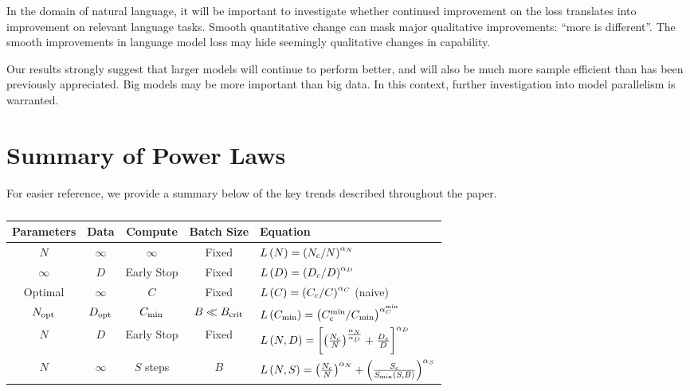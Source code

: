 \documentclass[english]{article}
\begin{document}
In the domain of natural language, it will be important to investigate whether continued improvement on the loss translates into improvement on relevant language tasks.  Smooth quantitative change can mask major qualitative improvements: ``more is different''.  The smooth improvements in language model loss may hide seemingly qualitative changes in capability.

Our results strongly suggest that larger models will continue to perform better, and will also be much more sample efficient than has been previously appreciated.  Big models may be more important than big data.  In this context, further investigation into model parallelism is warranted.

\newpage
\appendix
\appendixpage
\addappheadtotoc 


\section{Summary of Power Laws}

For easier reference, we provide a summary below of the key trends described throughout the paper.

\begin{table}[h!]
\centering
\vspace{-0.5em}
\begin{tabular}{|c|c|c|c|l|}
\hline 
\textbf{Parameters}  & \textbf{Data}  & \textbf{Compute}  & \textbf{Batch Size}  & \textbf{Equation}\tabularnewline
\hline 
\hline 
$N$  & $\infty$  & \multicolumn{1}{c|}{$\infty$ } & Fixed  & $L\left(N\right)=\left(N_{{\rm c}}/N\right)^{\alpha_{N}}$\tabularnewline
\hline 
$\infty$  & $D$  & \multicolumn{1}{c|}{Early Stop } & Fixed  & $L\left(D\right)=\left(D_{{\rm c}}/D\right)^{\alpha_{D}}$\tabularnewline
\hline 
Optimal  & $\infty$  & $C$  & Fixed  & $L\left(C\right)=\left(C_{{\rm c}}/C\right)^{\alpha_{C}}$ (naive)\tabularnewline
\hline 
$N_{{\rm opt}}$ & $D_{{\rm opt}}$ & $C_{{\rm min}}$  & $B\ll B_{{\rm crit}}$  & $L\left(C_{{\rm min}}\right)=\left(C_{{\rm c}}^{{\rm min}}/C_{{\rm min}}\right)^{\alpha_{C}^{{\rm min}}}$\tabularnewline
\hline 
$N$  & $D$  & \multicolumn{1}{c|}{Early Stop } & Fixed  & $L\left(N,D\right)=\left[\left(\frac{N_{{\rm c}}}{N}\right)^{\frac{\alpha_{N}}{\alpha_{D}}}+\frac{D_{c}}{D}\right]^{\alpha_{D}}$\tabularnewline
\hline 
$N$  & $\infty$  & $S$ steps & $B$  & $L\left(N,S\right)=\left(\frac{N_{{\rm c}}}{N}\right)^{\alpha_{N}}+\left(\frac{S_{{\rm c}}}{S_{{\rm min}}\left(S,B\right)}\right)^{\alpha_{S}}$\tabularnewline
\hline 
\end{tabular}
\vspace{0.5em}
\caption[Key trend equations]{}
\vspace{-1em}
\end{table}
\end{document}
